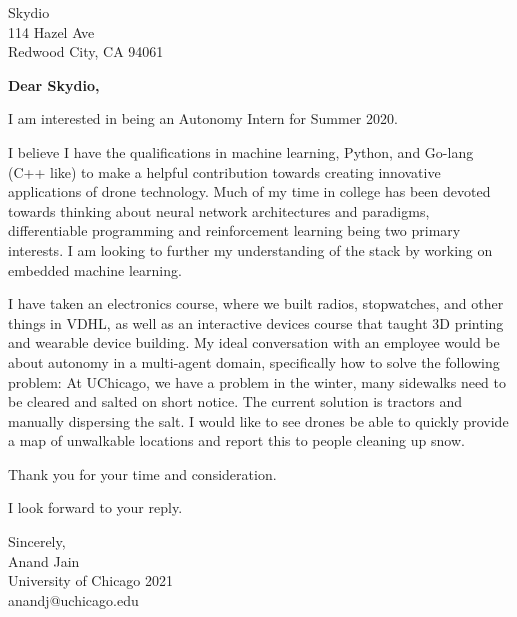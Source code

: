\documentclass[11pt,a4paper]{letter} %
\begin{document}
\begin{letter}{Skydio \\ 114 Hazel Ave \\ Redwood City, CA 94061} 

\opening{\textbf{Dear Skydio,}}

I am interested in being an Autonomy Intern for Summer 2020.

I believe I have the qualifications in machine learning, Python, and Go-lang (C++ like) to make a helpful contribution towards creating innovative applications of drone technology. Much of my time in college has been devoted towards thinking about neural network architectures and paradigms, differentiable programming and reinforcement learning being two primary interests. I am looking to further my understanding of the stack by working on embedded machine learning.

I have taken an electronics course, where we built radios, stopwatches, and other things in VDHL, as well as an interactive devices course that taught 3D printing and wearable device building. My ideal conversation with an employee would be about autonomy in a multi-agent domain, specifically how to solve the following problem: At UChicago, we have a problem in the winter, many sidewalks need to be cleared and salted on short notice. The current solution is tractors and manually dispersing the salt. I would like to see drones be able to quickly provide a map of unwalkable locations and report this to people cleaning up snow.

Thank you for your time and consideration.

I look forward to your reply.

\closing{Sincerely, \\ Anand Jain \\ University of Chicago 2021 \\ anandj@uchicago.edu}

\end{letter}
 
\end{document}
